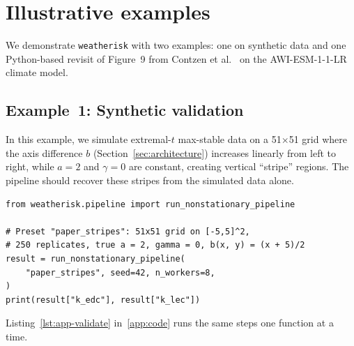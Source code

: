 \documentclass[preprint,12pt,a4paper]{elsarticle}
\newcommand{\rev}[1]{{#1}}
\newcommand{\revb}[1]{{#1}}
\begin{document}
\section{Illustrative examples}
\label{sec:examples}

We demonstrate \texttt{weatherisk} with \rev{two} examples: one on
synthetic data \rev{and one \revb{Python-based revisit of Figure~9 from Contzen}
et al.~\cite{contzen2025} on the AWI-ESM-1-1-LR climate model}.

\subsection{Example~1: Synthetic validation}
\label{sec:ex-synthetic}

In this example, we simulate extremal-$t$ max-stable data on a
51$\times$51 grid where the axis difference $b$ (Section~\ref{sec:architecture})
increases linearly from left to right, while $a = 2$ and $\gamma = 0$
are constant,
creating vertical ``stripe'' regions.  The pipeline should recover
these stripes from the simulated data alone.

\begin{lstlisting}[caption={Running the stripes validation.},
  label=lst:validate]
from weatherisk.pipeline import run_nonstationary_pipeline

# Preset "paper_stripes": 51x51 grid on [-5,5]^2,
# 250 replicates, true a = 2, gamma = 0, b(x, y) = (x + 5)/2
result = run_nonstationary_pipeline(
    "paper_stripes", seed=42, n_workers=8,
)
print(result["k_edc"], result["k_lec"])
\end{lstlisting}

\noindent Listing~\ref{lst:app-validate} in~\ref{app:code} runs the same
steps one function at a time.
\end{document}
